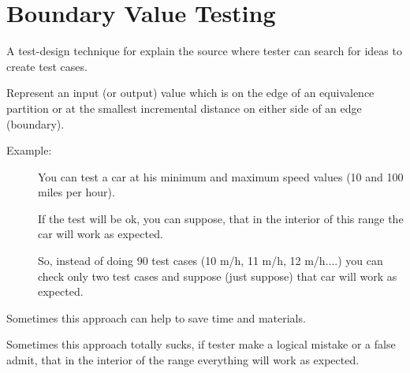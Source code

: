 \section{Boundary Value Testing}
\label{sec:Boundary Value Testing}

A test-design technique for explain the source where tester can search for ideas to create test cases.

Represent an input (or output) value which is on the edge of an equivalence partition or at the smallest incremental distance on either side of an edge (boundary).

\begin{description}
\item[Example:] 
       You can test a car at his minimum and maximum speed values (10 and 100 miles per hour). 
       
       If the test will be ok, you can suppose, that in the interior of this range the car will work as expected. 
       
       So, instead of doing 90 test cases (10 m/h, 11 m/h, 12 m/h....) you can check only two test cases and suppose (just suppose) that car will work as expected.
\end{description}

Sometimes this approach can help to save time and materials.

Sometimes this approach totally sucks, if tester make a logical mistake or a false admit, that in the interior of the range everything will work as expected.
